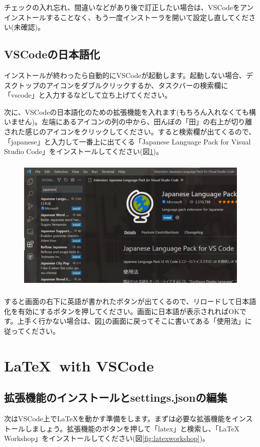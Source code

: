 チェックの入れ忘れ、間違いなどがあり後で訂正したい場合は、VSCodeをアンインストールすることなく、もう一度インストーラを開いて設定し直してください(未確認)。

\subsection{VSCodeの日本語化}
インストールが終わったら自動的にVSCodeが起動します。起動しない場合、デスクトップのアイコンをダブルクリックするか、タスクバーの検索欄に「vscode」と入力するなどして立ち上げてください。

次に、VSCodeの日本語化のための拡張機能を入れます(もちろん入れなくても構いません)。左端にあるアイコンの列の中から、田んぼの「田」の右上が切り離された感じのアイコンをクリックしてください。すると検索欄が出てくるので、「japanese」と入力して一番上に出てくる「Japanese Language Pack for Visual Studio Code」をインストールしてください(図\ref{fig:vsjp})。
\begin{figure}[H]
    \centering
    \includegraphics[height=65mm]{img/vsjp.png}
    \caption{}
    \label{fig:vsjp}
\end{figure}
すると画面の右下に英語が書かれたボタンが出てくるので、リロードして日本語化を有効にするボタンを押してください。画面に日本語が表示されればOKです。上手く行かない場合は、図\ref{fig:vsjp}の画面に戻ってそこに書いてある「使用法」に従ってください。

\section{\LaTeX \ with VSCode}\label{sec:vslatex}
\subsection{拡張機能のインストールとsettings.jsonの編集}\label{subsec:latexworkshop}
次はVSCode上で\LaTeX を動かす準備をします。まずは必要な拡張機能をインストールしましょう。拡張機能のボタンを押して「latex」と検索し、「LaTeX Workshop」をインストールしてください(図\ref{fig:latexworkshop})。

